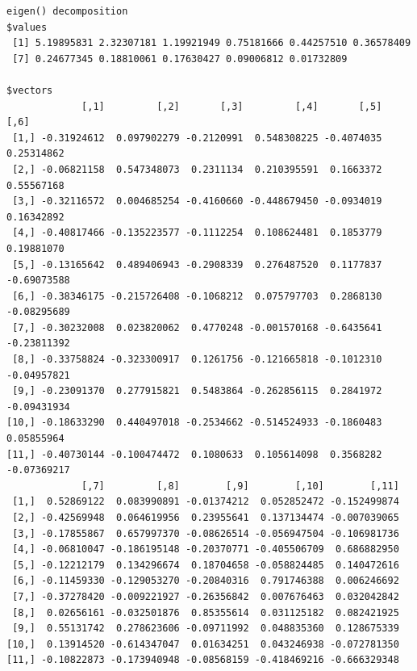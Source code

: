 \documentclass[
  letterpaper,
  DIV=11,
  numbers=noendperiod]{scrartcl}
\newenvironment{Shaded}{\begin{snugshade}}{\end{snugshade}}
\newcommand{\DecValTok}[1]{\textcolor[rgb]{0.68,0.00,0.00}{#1}}
\newcommand{\FunctionTok}[1]{\textcolor[rgb]{0.28,0.35,0.67}{#1}}
\newcommand{\NormalTok}[1]{\textcolor[rgb]{0.00,0.23,0.31}{#1}}
\newcommand{\OtherTok}[1]{\textcolor[rgb]{0.00,0.23,0.31}{#1}}
\newcommand{\SpecialCharTok}[1]{\textcolor[rgb]{0.37,0.37,0.37}{#1}}
\begin{document}
\begin{verbatim}
eigen() decomposition
$values
 [1] 5.19895831 2.32307181 1.19921949 0.75181666 0.44257510 0.36578409
 [7] 0.24677345 0.18810061 0.17630427 0.09006812 0.01732809

$vectors
             [,1]         [,2]       [,3]         [,4]       [,5]        [,6]
 [1,] -0.31924612  0.097902279 -0.2120991  0.548308225 -0.4074035  0.25314862
 [2,] -0.06821158  0.547348073  0.2311134  0.210395591  0.1663372  0.55567168
 [3,] -0.32116572  0.004685254 -0.4160660 -0.448679450 -0.0934019  0.16342892
 [4,] -0.40817466 -0.135223577 -0.1112254  0.108624481  0.1853779  0.19881070
 [5,] -0.13165642  0.489406943 -0.2908339  0.276487520  0.1177837 -0.69073588
 [6,] -0.38346175 -0.215726408 -0.1068212  0.075797703  0.2868130 -0.08295689
 [7,] -0.30232008  0.023820062  0.4770248 -0.001570168 -0.6435641 -0.23811392
 [8,] -0.33758824 -0.323300917  0.1261756 -0.121665818 -0.1012310 -0.04957821
 [9,] -0.23091370  0.277915821  0.5483864 -0.262856115  0.2841972 -0.09431934
[10,] -0.18633290  0.440497018 -0.2534662 -0.514524933 -0.1860483  0.05855964
[11,] -0.40730144 -0.100474472  0.1080633  0.105614098  0.3568282 -0.07369217
             [,7]         [,8]        [,9]        [,10]        [,11]
 [1,]  0.52869122  0.083990891 -0.01374212  0.052852472 -0.152499874
 [2,] -0.42569948  0.064619956  0.23955641  0.137134474 -0.007039065
 [3,] -0.17855867  0.657997370 -0.08626514 -0.056947504 -0.106981736
 [4,] -0.06810047 -0.186195148 -0.20370771 -0.405506709  0.686882950
 [5,] -0.12212179  0.134296674  0.18704658 -0.058824485  0.140472616
 [6,] -0.11459330 -0.129053270 -0.20840316  0.791746388  0.006246692
 [7,] -0.37278420 -0.009221927 -0.26356842  0.007676463  0.032042842
 [8,]  0.02656161 -0.032501876  0.85355614  0.031125182  0.082421925
 [9,]  0.55131742  0.278623606 -0.09711992  0.048835360  0.128675339
[10,]  0.13914520 -0.614347047  0.01634251  0.043246938 -0.072781350
[11,] -0.10822873 -0.173940948 -0.08568159 -0.418469216 -0.666329348
\end{verbatim}

\begin{Shaded}
\end{Shaded}
\end{document}
